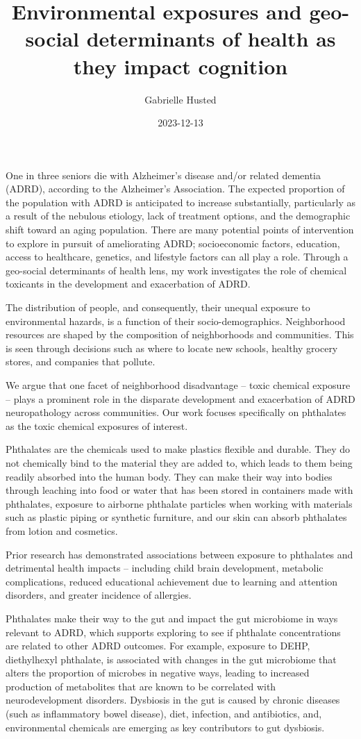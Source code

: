 \documentclass[
]{article}
\title{Environmental exposures and geo-social determinants of health as
they impact cognition}
\author{Gabrielle Husted}
\date{2023-12-13}
\begin{document}
\maketitle

One in three seniors die with Alzheimer's disease and/or related
dementia (ADRD), according to the Alzheimer's Association. The expected
proportion of the population with ADRD is anticipated to increase
substantially, particularly as a result of the nebulous etiology, lack
of treatment options, and the demographic shift toward an aging
population. There are many potential points of intervention to explore
in pursuit of ameliorating ADRD; socioeconomic factors, education,
access to healthcare, genetics, and lifestyle factors can all play a
role. Through a geo-social determinants of health lens, my work
investigates the role of chemical toxicants in the development and
exacerbation of ADRD.

The distribution of people, and consequently, their unequal exposure to
environmental hazards, is a function of their socio-demographics.
Neighborhood resources are shaped by the composition of neighborhoods
and communities. This is seen through decisions such as where to locate
new schools, healthy grocery stores, and companies that pollute.

We argue that one facet of neighborhood disadvantage -- toxic chemical
exposure -- plays a prominent role in the disparate development and
exacerbation of ADRD neuropathology across communities. Our work focuses
specifically on phthalates as the toxic chemical exposures of interest.

Phthalates are the chemicals used to make plastics flexible and durable.
They do not chemically bind to the material they are added to, which
leads to them being readily absorbed into the human body. They can make
their way into bodies through leaching into food or water that has been
stored in containers made with phthalates, exposure to airborne
phthalate particles when working with materials such as plastic piping
or synthetic furniture, and our skin can absorb phthalates from lotion
and cosmetics.

Prior research has demonstrated associations between exposure to
phthalates and detrimental health impacts -- including child brain
development, metabolic complications, reduced educational achievement
due to learning and attention disorders, and greater incidence of
allergies.

Phthalates make their way to the gut and impact the gut microbiome in
ways relevant to ADRD, which supports exploring to see if phthalate
concentrations are related to other ADRD outcomes. For example, exposure
to DEHP, diethylhexyl phthalate, is associated with changes in the gut
microbiome that alters the proportion of microbes in negative ways,
leading to increased production of metabolites that are known to be
correlated with neurodevelopment disorders. Dysbiosis in the gut is
caused by chronic diseases (such as inflammatory bowel disease), diet,
infection, and antibiotics, and, environmental chemicals are emerging as
key contributors to gut dysbiosis.
\end{document}
